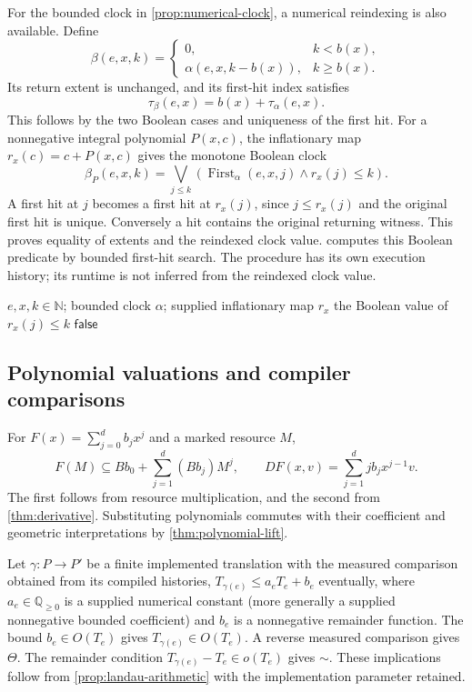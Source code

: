 \documentclass[11pt,a4paper]{article}
\numberwithin{algorithm}{section}
\numberwithin{equation}{section}
\theoremstyle{definition}
\theoremstyle{remark}
\theoremstyle{plain}
\newcommand{\N}{\mathbb N}
\newcommand{\QQ}{\mathbb Q}
\newcommand{\Qplus}{{\QQ_{\ge0}}}
\theoremstyle{definition}
\theoremstyle{plain}
\begin{document}
For the bounded clock in \cref{prop:numerical-clock}, a numerical
reindexing is also available. Define
\[
 \beta(e,x,k)=\begin{cases}
 0,&k<b(x),\\
 \alpha(e,x,k-b(x)),&k\ge b(x).
 \end{cases}
\]
Its return extent is unchanged, and its first-hit index satisfies
\begin{equation}\label{eq:delay-firsthit}
 \tau_\beta(e,x)=b(x)+\tau_\alpha(e,x).
\end{equation}
This follows by the two Boolean cases and uniqueness of the first hit.
For a nonnegative integral polynomial $P(x,c)$, the inflationary map
$r_x(c)=c+P(x,c)$ gives the monotone Boolean clock
\[
 \beta_P(e,x,k)=\bigvee_{j\le k}
   (\operatorname{First}_\alpha(e,x,j)\wedge r_x(j)\le k).
\]
A first hit at $j$ becomes a first hit at $r_x(j)$, since $j\le r_x(j)$
and the original first hit is unique. Conversely a hit contains the
original returning witness. This proves equality of extents and the
reindexed clock value.  computes this Boolean predicate by
bounded first-hit search. The procedure has its own execution history;
its runtime is not inferred from the reindexed clock value.
\begin{algorithm}[H]
\caption{Bounded first-hit search and clock regrading}\label{alg:clock-regrading}
\small
\begin{algorithmic}[1]
\Require $e,x,k\in\N$; bounded clock $\alpha$; supplied inflationary map $r_x$
    \State \Return the Boolean value of $r_x(j)\le k$
  \EndIf
\EndFor
\State \Return $\mathsf{false}$
\end{algorithmic}
\end{algorithm}

\subsection{Polynomial valuations and compiler comparisons}
For $F(x)=\sum_{j=0}^d b_jx^j$ and a marked resource $M$,
\[
 F(M)\subseteq Bb_0+\sum_{j=1}^d(Bb_j)M^j,\qquad
 DF(x,v)=\sum_{j=1}^d j b_jx^{j-1}v.
\]
The first follows from resource multiplication, and the
second from \cref{thm:derivative}. Substituting polynomials
commutes with their coefficient and geometric interpretations
by \cref{thm:polynomial-lift}.

Let $\gamma:P\to P'$ be a finite implemented translation with
the measured comparison obtained from its compiled histories,
$T_{\gamma(e)}\le a_eT_e+b_e$ eventually, where
$a_e\in\Qplus$ is a supplied numerical constant (more generally a
supplied nonnegative bounded coefficient) and $b_e$ is a
nonnegative remainder function.
The bound $b_e\in O(T_e)$ gives
$T_{\gamma(e)}\in O(T_e)$.
A reverse measured comparison gives $\Theta$.
The remainder condition
$T_{\gamma(e)}-T_e\in o(T_e)$ gives $\sim$.
These implications follow from \cref{prop:landau-arithmetic}
with the implementation parameter retained.
\end{document}
